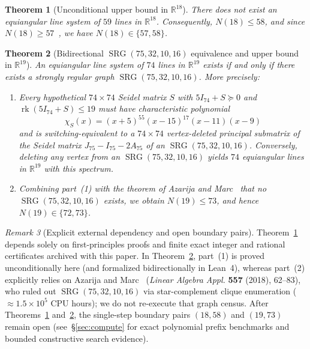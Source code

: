 \documentclass[11pt,reqno]{amsart}
\newtheorem{theorem}{Theorem}[section]
\theoremstyle{definition}
\theoremstyle{remark}
\newtheorem{remark}[theorem]{Remark}
\numberwithin{equation}{section}
\numberwithin{table}{section}
\DeclareMathOperator{\rk}{rk}
\DeclareMathOperator{\SRG}{SRG}
\begin{document}
\begin{theorem}[Unconditional upper bound in $\mathbb{R}^{18}$]\label{thm:main18}
There does not exist an equiangular line system of $59$ lines in $\mathbb{R}^{18}$. Consequently, $N(18) \le 58$, and since $N(18) \ge 57$~\cite{GSY2023}, we have $N(18) \in \{57, 58\}$.
\end{theorem}

\begin{theorem}[Bidirectional $\SRG(75, 32, 10, 16)$ equivalence and upper bound in $\mathbb{R}^{19}$]\label{thm:main19}
An equiangular line system of $74$ lines in $\mathbb{R}^{19}$ exists if and only if there exists a strongly regular graph $\SRG(75, 32, 10, 16)$. More precisely:
\begin{enumerate}
  \item Every hypothetical $74 \times 74$ Seidel matrix $S$ with $5I_{74} + S \succeq 0$ and $\rk(5I_{74} + S) \le 19$ must have characteristic polynomial
  \[
    \chi_S(x) = (x + 5)^{55}(x - 15)^{17}(x - 11)(x - 9)
  \]
  and is switching-equivalent to a $74 \times 74$ vertex-deleted principal submatrix of the Seidel matrix $J_{75} - I_{75} - 2A_{75}$ of an $\SRG(75, 32, 10, 16)$. Conversely, deleting any vertex from an $\SRG(75, 32, 10, 16)$ yields $74$ equiangular lines in $\mathbb{R}^{19}$ with this spectrum.
  \item Combining part~(1) with the theorem of Azarija and Marc~\cite{AzarijaMarc2018} that no $\SRG(75, 32, 10, 16)$ exists, we obtain $N(19) \le 73$, and hence $N(19) \in \{72, 73\}$.
\end{enumerate}
\end{theorem}

\begin{remark}[Explicit external dependency and open boundary pairs]\label{rem:external_open}
Theorem~\ref{thm:main18} depends solely on first-principles proofs and finite exact integer and rational certificates archived with this paper. In Theorem~\ref{thm:main19}, part~(1) is proved unconditionally here (and formalized bidirectionally in Lean~4), whereas part~(2) explicitly relies on Azarija and Marc~\cite{AzarijaMarc2018} (\emph{Linear Algebra Appl.} \textbf{557} (2018), 62--83), who ruled out $\SRG(75, 32, 10, 16)$ via star-complement clique enumeration ($\approx 1.5 \times 10^5$ CPU hours); we do not re-execute that graph census. After Theorems~\ref{thm:main18} and~\ref{thm:main19}, the single-step boundary pairs $(18, 58)$ and $(19, 73)$ remain open (see~\S\ref{sec:compute} for exact polynomial prefix benchmarks and bounded constructive search evidence).
\end{remark}
\end{document}
